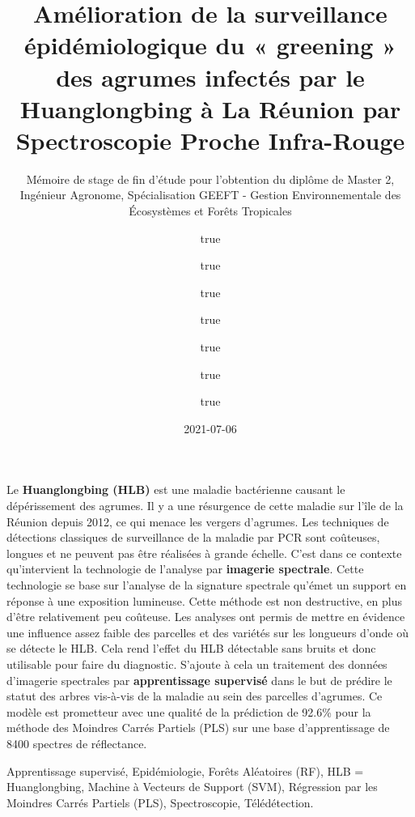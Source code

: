 \documentclass[
  11pt,
  french,
  a4paper,
  extrafontsizes,onecolumn,openright
  ]{memoir}
\title{Amélioration de la surveillance épidémiologique du « greening » des agrumes infectés par le Huanglongbing à La Réunion par Spectroscopie Proche Infra-Rouge}
\subtitle{Mémoire de stage de fin d'étude pour l'obtention du diplôme de Master 2, Ingénieur Agronome, Spécialisation GEEFT - Gestion Environnementale des Écosystèmes et Forêts Tropicales}
\author{true \and true \and true \and true \and true \and true \and true}
\date{2021-07-06}
\begin{document}
\frontmatter



\cleardoublepage



\begin{description}

\item[Résumé:]
Le \textbf{Huanglongbing (HLB)} est une maladie bactérienne causant le dépérissement des agrumes. Il y a une résurgence de cette maladie sur l'île de la Réunion depuis 2012, ce qui menace les vergers d'agrumes. Les techniques de détections classiques de surveillance de la maladie par PCR sont coûteuses, longues et ne peuvent pas être réalisées à grande échelle. C'est dans ce contexte qu'intervient la technologie de l'analyse par \textbf{imagerie spectrale}. Cette technologie se base sur l'analyse de la signature spectrale qu'émet un support en réponse à une exposition lumineuse. Cette méthode est non destructive, en plus d'être relativement peu coûteuse. Les analyses ont permis de mettre en évidence une influence assez faible des parcelles et des variétés sur les longueurs d'onde où se détecte le HLB. Cela rend l'effet du HLB détectable sans bruits et donc utilisable pour faire du diagnostic. S'ajoute à cela un traitement des données d'imagerie spectrales par \textbf{apprentissage supervisé} dans le but de prédire le statut des arbres vis-à-vis de la maladie au sein des parcelles d'agrumes. Ce modèle est prometteur avec une qualité de la prédiction de 92.6\% pour la méthode des Moindres Carrés Partiels (PLS) sur une base d'apprentissage de 8400 spectres de réflectance.

\item[Mots clés :]
Apprentissage supervisé, Epidémiologie, Forêts Aléatoires (RF), HLB = Huanglongbing, Machine à Vecteurs de Support (SVM), Régression par les Moindres Carrés Partiels (PLS), Spectroscopie, Télédétection.


\end{description}
\end{document}
